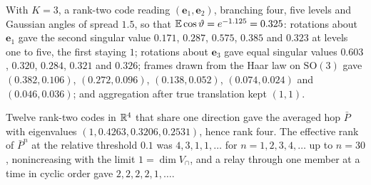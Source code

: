 \begin{numcheck}\label{chk:ren-codes}
With $K=3$, a rank-two code reading $(\mathbf e_1,\mathbf e_2)$, branching four, five levels and Gaussian angles of spread $1.5$, so that $\mathbb{E}\cos\vartheta=e^{-1.125}=0.325$: rotations about $\mathbf e_1$ gave the second singular value $0.171$, $0.287$, $0.575$, $0.385$ and $0.323$ at levels one to five, the first staying $1$; rotations about $\mathbf e_3$ gave equal singular values $0.603$, $0.320$, $0.284$, $0.321$ and $0.326$; frames drawn from the Haar law on $\mathrm{SO}(3)$ gave $(0.382,0.106)$, $(0.272,0.096)$, $(0.138,0.052)$, $(0.074,0.024)$ and $(0.046,0.036)$; and aggregation after true translation kept $(1,1)$.
\end{numcheck}

\begin{numcheck}\label{chk:ren-relay}
Twelve rank-two codes in $\mathbb{R}^4$ that share one direction gave the averaged hop $\bar P$ with eigenvalues $(1,0.4263,0.3206,0.2531)$, hence rank four. The effective rank of $\bar P^n$ at the relative threshold $0.1$ was $4,3,1,1,\dots$ for $n=1,2,3,4,\dots$ up to $n=30$, nonincreasing with the limit $1=\dim V_\cap$, and a relay through one member at a time in cyclic order gave $2,2,2,2,1,\dots$.
\end{numcheck}

